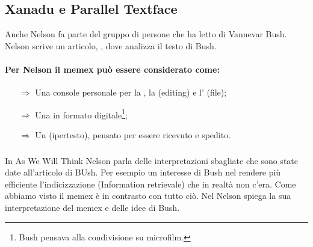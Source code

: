 \subsection{Xanadu e Parallel Textface}

Anche Nelson fa parte del gruppo di persone che ha letto  di Vannevar Bush.
Nelson scrive un articolo, , dove analizza il testo di Bush. 

\paragraph{Per Nelson il memex può essere considerato come:}

\begin{itemize}
    \item [$\Rightarrow$] Una console personale per la , la 
     (editing) e l' (file);
    \item [$\Rightarrow$] Una  in formato digitale\footnote{Bush pensava alla condivisione su microfilm.};
    \item [$\Rightarrow$] Un  (ipertesto), pensato per essere ricevuto e spedito.
\end{itemize}

\subsubsection{}

In As We Will Think Nelson parla delle interpretazioni sbagliate che sono 
state date all'articolo di BUsh. Per esempio un interesse di Bush nel rendere 
più efficiente l'indicizzazione (Information retrievale) che in realtà non c'era.
Come abbiamo visto il memex è in contrasto con tutto ciò.
Nel  Nelson spiega la sua interpretazione del 
memex e delle idee di Bush.



